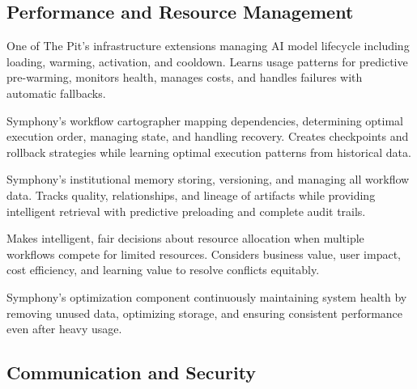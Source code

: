 \subsection*{Performance and Resource Management}

\begin{description}[leftmargin=4cm,labelwidth=3.5cm]

\item[\textbf{Pool Manager}] One of The Pit's infrastructure extensions managing AI model lifecycle including loading, warming, activation, and cooldown. Learns usage patterns for predictive pre-warming, monitors health, manages costs, and handles failures with automatic fallbacks.

\item[\textbf{DAG Tracker}] Symphony's workflow cartographer mapping dependencies, determining optimal execution order, managing state, and handling recovery. Creates checkpoints and rollback strategies while learning optimal execution patterns from historical data.

\item[\textbf{Artifact Store}] Symphony's institutional memory storing, versioning, and managing all workflow data. Tracks quality, relationships, and lineage of artifacts while providing intelligent retrieval with predictive preloading and complete audit trails.

\item[\textbf{Arbitration Engine}] Makes intelligent, fair decisions about resource allocation when multiple workflows compete for limited resources. Considers business value, user impact, cost efficiency, and learning value to resolve conflicts equitably.

\item[\textbf{Stale Manager}] Symphony's optimization component continuously maintaining system health by removing unused data, optimizing storage, and ensuring consistent performance even after heavy usage.

\end{description}

\subsection*{Communication and Security}

